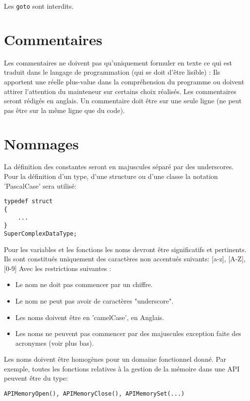 Les \texttt{goto} sont interdits.

\section{Commentaires}
Les commentaires ne doivent pas qu’uniquement formuler en texte ce qui est traduit
dans le langage de programmation (qui se doit d'être lisible) : \newline
Ils apportent une réelle plus-value dans la compréhension du programme ou doivent
attirer l’attention du mainteneur sur certains choix réalisés. Les commentaires seront 
rédigés en anglais. \newline
Un commentaire doit être sur une seule ligne (ne peut pas être sur la même ligne 
que du code).
 
\section{Nommages}
La définition des constantes seront en majuscules séparé par des underscores.\newline
Pour la définition d'un type, d'une structure ou d'une classe la notation 'PascalCase'
sera utilisé: 
\begin{verbatim}
typedef struct 
{
    ...
}
SuperComplexDataType;
\end{verbatim}

Pour les variables et les fonctions les noms devront être significatifs et 
pertinents.\newline
Ils sont constitués uniquement des caractères non accentués suivants: 
[a-z], [A-Z], [0-9]\newline
Avec les restrictions suivantes :
\begin{itemize}
	\item Le nom ne doit pas commencer par un chiffre.
	\item Le nom ne peut pas avoir de caractères "underscore".
	\item Les noms doivent être en 'camelCase', en Anglais.
	\item Les noms ne peuvent pas commencer par des majuscules exception faite
          des acronymes (voir plus bas).
\end{itemize}
Les noms doivent être homogènes pour un domaine fonctionnel donné. Par exemple, 
toutes les fonctions relatives à la gestion de la mémoire dans une API peuvent 
être du type: \newline 
\begin{verbatim}
APIMemoryOpen(), APIMemoryClose(), APIMemorySet(...)
\end{verbatim}

